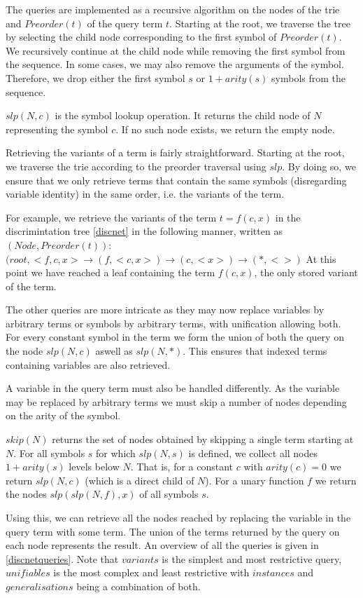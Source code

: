 The queries are implemented as a recursive algorithm on the nodes of the trie and $Preorder(t)$ of the query term $t$. Starting at the root, we traverse the tree by selecting the child node corresponding to the first symbol of $Preorder(t)$. We recursively continue at the child node while removing the first symbol from the sequence. In some cases, we may also remove the arguments of the symbol. Therefore, we drop either the first symbol $s$ or $1 + arity(s)$ symbols from the sequence.

\begin{defn}
  $slp(N,c)$ is the symbol lookup operation. It returns the child node of $N$ representing the symbol $c$. If no such node exists, we return the empty node.
\end{defn}

Retrieving the variants of a term is fairly straightforward. Starting at the root, we traverse the trie according to the preorder traversal using $slp$. By doing so, we ensure that we only retrieve terms that contain the same symbols (disregarding variable identity) in the same order, i.e. the variants of the term.

For example, we retrieve the variants of the term $t = f(c,x)$ in the discrimintation tree \ref{discnet} in the following manner, written as $(Node, Preorder(t))$:
$(root, <f,c,x> \rightarrow (f, <c,x>) \rightarrow (c, <x>) \rightarrow (*,<>)$
At this point we have reached a leaf containing the term $f(c,x)$, the only stored variant of the term.

The other queries are more intricate as they may now replace variables by arbitrary terms or symbols by arbitrary terms, with unification allowing both. For every constant symbol in the term we form the union of both the query on the node $slp(N,c)$ aswell as $slp(N,*)$. This ensures that indexed terms containing variables are also retrieved.

A variable in the query term must also be handled differently. As the variable may be replaced by arbitrary terms we must skip a number of nodes depending on the arity of the symbol.
\begin{defn}
  $skip(N)$ returns the set of nodes obtained by skipping a single term starting at $N$. For all symbols $s$ for which $slp(N,s)$ is defined, we collect all nodes $1 + arity(s)$ levels below $N$. That is, for a constant $c$ with $arity(c) = 0$ we return $slp(N,c)$ (which is a direct child of $N$). For a unary function $f$ we return the nodes $slp(slp(N,f),x)$ of all symbols $s$.
\end{defn}
Using this, we can retrieve all the nodes reached by replacing the variable in the query term with some term. The union of the terms returned by the query on each node represents the result. An overview of all the queries is given in \ref{discnetqueries}. Note that $variants$ is the simplest and most restrictive query, $unifiables$ is the most complex and least restrictive with $instances$ and $generalisations$ being a combination of both.

